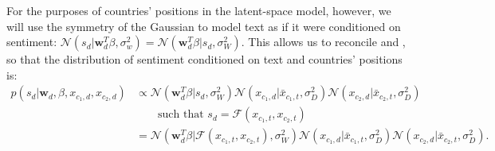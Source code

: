 For the purposes of countries' positions in the latent-space model,
however, we will use the symmetry of the Gaussian to model text as if
it were conditioned on sentiment: $\mathcal{N}(s_d | \bm w_d^T \beta,
\sigma_w^2) = \mathcal{N}( \bm w_d^T \beta | s_d, \sigma_W^2 )$.  This
allows us to reconcile  and
, so that the distribution of sentiment
conditioned on text and countries' positions is:
\begin{align}
  p(s_d | \bm w_d, \beta, x_{c_1,d}, x_{c_2,d}) & \propto
  \mathcal{N}(\bm w_d^T \beta | s_d, \sigma_W^2 )
  \mathcal{N}(x_{c_1,d} | \bar x_{c_1, t}, \sigma_D^2)
  \mathcal{N}(x_{c_2,d} | \bar x_{c_2, t}, \sigma_D^2) \nonumber \\
  & \hspace{20pt} \mbox{ such that } s_d = \mathcal{F}(x_{c_1,t},
  x_{c_2,t}) \nonumber \\
  & = 
  \mathcal{N}(\bm w_d^T \beta |
    \mathcal{F}(x_{c_1,t}, x_{c_2,t}), \sigma_W^2 )
  \mathcal{N}(x_{c_1,d} | \bar x_{c_1, t}, \sigma_D^2)
  \mathcal{N}(x_{c_2,d} | \bar x_{c_2, t}, \sigma_D^2).
\end{align}



